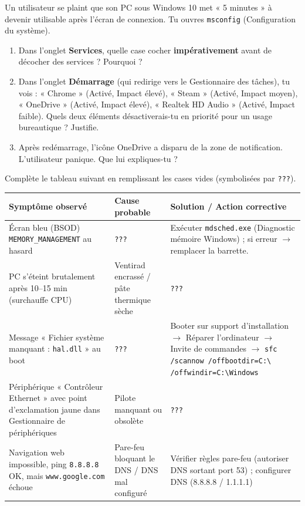 \documentclass[11pt]{article}
\begin{document}
\begin{exercice}
Un utilisateur se plaint que son PC sous Windows 10 met « 5 minutes » à devenir utilisable après l'écran de connexion. Tu ouvres \texttt{msconfig} (Configuration du système).
\begin{enumerate}
    \item Dans l'onglet \textbf{Services}, quelle case cocher \textbf{impérativement} avant de décocher des services ? Pourquoi ?
    \item Dans l'onglet \textbf{Démarrage} (qui redirige vers le Gestionnaire des tâches), tu vois : « Chrome » (Activé, Impact élevé), « Steam » (Activé, Impact moyen), « OneDrive » (Activé, Impact élevé), « Realtek HD Audio » (Activé, Impact faible). Quels deux éléments désactiverais-tu en priorité pour un usage bureautique ? Justifie.
    \item Après redémarrage, l'icône OneDrive a disparu de la zone de notification. L'utilisateur panique. Que lui expliques-tu ?
\end{enumerate}
\end{exercice}

\begin{exercice}
Complète le tableau suivant en remplissant les cases vides (symbolisées par \texttt{???}).

\begin{center}
\begin{tabularx}{\linewidth}{|X|X|X|}\hline
\rowcolor{popblueL}
\textbf{Symptôme observé} & \textbf{Cause probable} & \textbf{Solution / Action corrective} \\\hline
Écran bleu (BSOD) \texttt{MEMORY\_MANAGEMENT} au hasard & \texttt{???} & Exécuter \texttt{mdsched.exe} (Diagnostic mémoire Windows) ; si erreur $\rightarrow$ remplacer la barrette. \\\hline
PC s'éteint brutalement après 10--15 min (surchauffe CPU) & Ventirad encrassé / pâte thermique sèche & \texttt{???} \\\hline
Message « Fichier système manquant : \texttt{hal.dll} » au boot & \texttt{???} & Booter sur support d'installation $\rightarrow$ Réparer l'ordinateur $\rightarrow$ Invite de commandes $\rightarrow$ \texttt{sfc /scannow /offbootdir=C:\textbackslash{} /offwindir=C:\textbackslash Windows} \\\hline
Périphérique « Contrôleur Ethernet » avec point d'exclamation jaune dans Gestionnaire de périphériques & Pilote manquant ou obsolète & \texttt{???} \\\hline
Navigation web impossible, ping \texttt{8.8.8.8} OK, mais \texttt{www.google.com} échoue & Pare-feu bloquant le DNS / DNS mal configuré & Vérifier règles pare-feu (autoriser DNS sortant port 53) ; configurer DNS (8.8.8.8 / 1.1.1.1) \\\hline
\end{tabularx}
\end{center}
\end{exercice}
\end{document}
